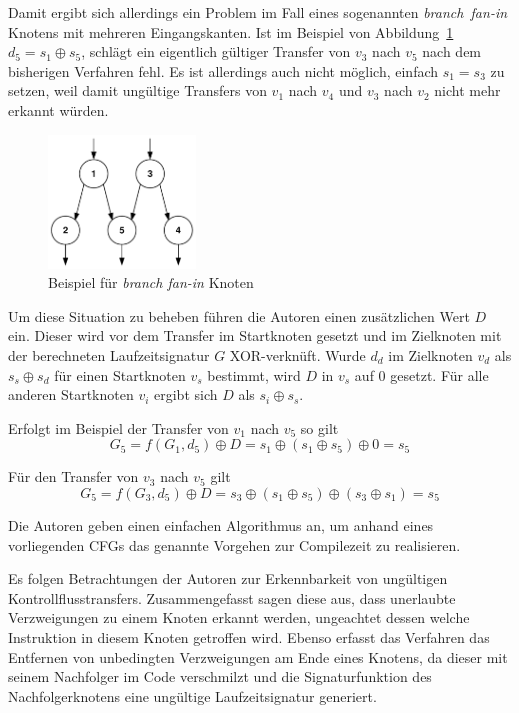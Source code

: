 \documentclass[11pt]{article}
\begin{document}

Damit ergibt sich allerdings ein Problem im Fall eines sogenannten
\mbox{\emph{branch fan-in}} Knotens mit mehreren Eingangskanten. Ist im
Beispiel von Abbildung~\ref{fig:fanin-node} $ d_5 = s_1 \oplus s_5 $, schlägt
ein eigentlich gültiger Transfer von $ v_3 $ nach $ v_5 $ nach dem bisherigen
Verfahren fehl. Es ist allerdings auch nicht möglich, einfach $ s_1 = s_3 $ zu
setzen, weil damit ungültige Transfers von $ v_1 $ nach $ v_4 $ und $ v_3
$ nach $ v_2 $ nicht mehr erkannt würden.

\begin{figure}
  \centering
  \includegraphics[width=0.35\textwidth]{fanin-node}
  \caption{Beispiel für \emph{branch fan-in} Knoten}
  \label{fig:fanin-node}
\end{figure}

Um diese Situation zu beheben führen die Autoren einen zusätzlichen Wert
$ D $ ein. Dieser wird vor dem Transfer im Startknoten gesetzt und im
Zielknoten mit der berechneten Laufzeitsignatur $ G $ XOR-verknüft.  Wurde
$ d_d $ im Zielknoten $ v_d $ als $ s_s \oplus s_d $ für einen Startknoten
$ v_s $ bestimmt, wird $ D $ in $ v_s $ auf $ 0 $ gesetzt. Für alle anderen
Startknoten $ v_i $ ergibt sich $ D $ als $ s_i \oplus s_s $.

Erfolgt im Beispiel der Transfer von $ v_1 $ nach $ v_5 $ so gilt $$ G_5
= f(G_1, d_5) \oplus D = s_1 \oplus (s_1 \oplus s_5) \oplus 0 = s_5 $$

Für den Transfer von $ v_3 $ nach $ v_5 $ gilt $$ G_5 = f(G_3, d_5) \oplus
D = s_3 \oplus (s_1 \oplus s_5) \oplus (s_3 \oplus s_1) = s_5 $$

Die Autoren geben einen einfachen Algorithmus an, um anhand eines vorliegenden
CFGs das genannte Vorgehen zur Compilezeit zu realisieren.

Es folgen Betrachtungen der Autoren zur Erkennbarkeit von ungültigen
Kontrollflusstransfers. Zusammengefasst sagen diese aus, dass unerlaubte
Verzweigungen zu einem Knoten erkannt werden, ungeachtet dessen welche
Instruktion in diesem Knoten getroffen wird. Ebenso erfasst das Verfahren das
Entfernen von unbedingten Verzweigungen am Ende eines Knotens, da dieser mit
seinem Nachfolger im Code verschmilzt und die Signaturfunktion des
Nachfolgerknotens eine ungültige Laufzeitsignatur generiert.
\end{document}
